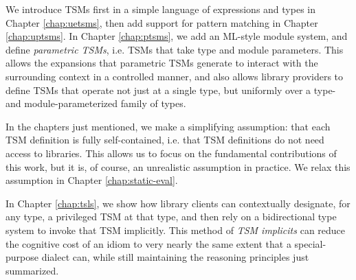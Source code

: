 We  introduce TSMs first in a simple language of expressions and types in Chapter \ref{chap:uetsms}, then add support for pattern matching  in Chapter \ref{chap:uptsms}. In Chapter \ref{chap:ptsms}, we add an ML-style module system, and define \emph{parametric TSMs}, i.e. TSMs that take type and module parameters. This allows the expansions that parametric TSMs generate to interact with the surrounding context in a controlled manner, and also allows library providers to define TSMs that operate not just at a single type, but uniformly over a type- and module-parameterized family of types.

In the chapters just mentioned, we make a simplifying assumption: that each TSM definition is fully self-contained, i.e. that TSM definitions do not need access to libraries. This allows us to focus on the fundamental contributions of this work, but it is, of course, an unrealistic assumption in practice. We relax this assumption in Chapter \ref{chap:static-eval}.

In Chapter \ref{chap:tsls}, we show how library clients can contextually designate, for any type, a privileged TSM at that type, and then rely on a bidirectional type system to invoke that TSM implicitly. This method of \emph{TSM implicits} can reduce the cognitive cost of an idiom to very nearly the same extent that a special-purpose dialect can, while still maintaining the reasoning principles just summarized.


